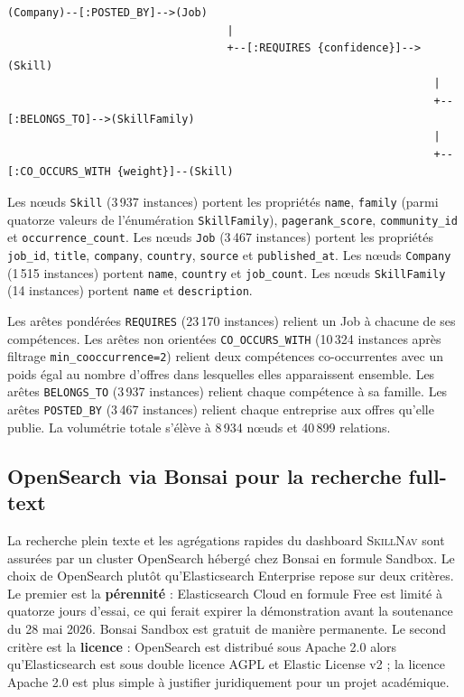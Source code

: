 \documentclass[11pt,a4paper,openany]{report}
\newcommand{\skillnav}{\textsc{SkillNav}\xspace}
\begin{document}
\begin{lstlisting}[language={},numbers=none,caption={Sch\'ema topologique du graphe Neo4j}]
       (Company)--[:POSTED_BY]-->(Job)
                                  |
                                  +--[:REQUIRES {confidence}]-->(Skill)
                                                                  |
                                                                  +--[:BELONGS_TO]-->(SkillFamily)
                                                                  |
                                                                  +--[:CO_OCCURS_WITH {weight}]--(Skill)
\end{lstlisting}

Les n\oe uds \texttt{Skill} (3\,937 instances) portent les propri\'et\'es \texttt{name}, \texttt{family} (parmi quatorze valeurs de l'\'enum\'eration \texttt{SkillFamily}), \texttt{pagerank\_score}, \texttt{community\_id} et \texttt{occurrence\_count}. Les n\oe uds \texttt{Job} (3\,467 instances) portent les propri\'et\'es \texttt{job\_id}, \texttt{title}, \texttt{company}, \texttt{country}, \texttt{source} et \texttt{published\_at}. Les n\oe uds \texttt{Company} (1\,515 instances) portent \texttt{name}, \texttt{country} et \texttt{job\_count}. Les n\oe uds \texttt{SkillFamily} (14 instances) portent \texttt{name} et \texttt{description}.

Les ar\^etes pond\'er\'ees \texttt{REQUIRES} (23\,170 instances) relient un Job \`a chacune de ses comp\'etences. Les ar\^etes non orient\'ees \texttt{CO\_OCCURS\_WITH} (10\,324 instances apr\`es filtrage \texttt{min\_cooccurrence=2}) relient deux comp\'etences co-occurrentes avec un poids \'egal au nombre d'offres dans lesquelles elles apparaissent ensemble. Les ar\^etes \texttt{BELONGS\_TO} (3\,937 instances) relient chaque comp\'etence \`a sa famille. Les ar\^etes \texttt{POSTED\_BY} (3\,467 instances) relient chaque entreprise aux offres qu'elle publie. La volum\'etrie totale s'\'el\`eve \`a 8\,934 n\oe uds et 40\,899 relations.

\subsection{OpenSearch via Bonsai pour la recherche full-text}

La recherche plein texte et les agr\'egations rapides du dashboard \skillnav sont assur\'ees par un cluster OpenSearch h\'eberg\'e chez Bonsai en formule Sandbox. Le choix de OpenSearch plut\^ot qu'Elasticsearch Enterprise repose sur deux crit\`eres. Le premier est la \textbf{p\'erennit\'e} : Elasticsearch Cloud en formule Free est limit\'e \`a quatorze jours d'essai, ce qui ferait expirer la d\'emonstration avant la soutenance du 28 mai 2026. Bonsai Sandbox est gratuit de mani\`ere permanente. Le second crit\`ere est la \textbf{licence} : OpenSearch est distribu\'e sous Apache 2.0 alors qu'Elasticsearch est sous double licence AGPL et Elastic License v2 ; la licence Apache 2.0 est plus simple \`a justifier juridiquement pour un projet acad\'emique.
\end{document}
